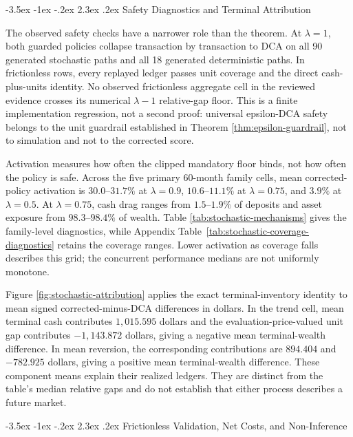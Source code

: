 \documentclass[12pt,a4paper,oneside]{report}
\makeatletter
\renewcommand\section{\@startsection{section}{1}{\z@}%
  {-3.5ex \@plus -1ex \@minus -.2ex}%
  {2.3ex \@plus .2ex}%
  {\normalfont\fontsize{14}{17}\selectfont\bfseries}}
\makeatother
\begin{document}
\section{Safety Diagnostics and Terminal Attribution}
\label{sec:synthetic-mechanisms}
\label{sec:safety-checks}

The observed safety checks have a narrower role than the theorem. At
$\lambda=1$, both guarded policies collapse transaction by transaction to DCA
on all 90 generated stochastic paths and all 18 generated deterministic
paths. In frictionless rows, every replayed ledger passes unit coverage and the direct
cash-plus-units identity. No observed frictionless aggregate cell in the
reviewed evidence crosses its numerical $\lambda-1$ relative-gap floor. This
is a finite implementation regression, not a second proof: universal
epsilon-DCA safety belongs to the unit guardrail established in Theorem
\ref{thm:epsilon-guardrail}, not to simulation and not to the corrected score.



Activation measures how often the clipped mandatory floor binds, not how often
the policy is safe. Across the five primary 60-month family cells, mean
corrected-policy activation is $30.0$--$31.7\%$ at $\lambda=0.9$,
$10.6$--$11.1\%$ at $\lambda=0.75$, and $3.9\%$ at $\lambda=0.5$.
At $\lambda=0.75$, cash drag ranges from $1.5$--$1.9\%$ of deposits and
asset exposure from $98.3$--$98.4\%$ of wealth. Table
\ref{tab:stochastic-mechanisms} gives the family-level diagnostics, while
Appendix Table~\ref{tab:stochastic-coverage-diagnostics} retains the coverage
ranges. Lower activation as coverage falls describes this grid; the concurrent
performance medians are not uniformly monotone.

Figure \ref{fig:stochastic-attribution} applies the exact terminal-inventory
identity to mean signed corrected-minus-DCA differences in dollars. In the
trend cell, mean
terminal cash contributes $1,015.595$ dollars and the evaluation-price-valued
unit gap contributes $-1,143.872$ dollars, giving a
negative mean terminal-wealth difference. In mean reversion, the corresponding
contributions are $894.404$ and $-782.925$ dollars, giving a
positive mean terminal-wealth difference. These component means
explain their realized ledgers. They are distinct from the table's median
relative gaps and do not establish that either process describes a future
market.

\section{Frictionless Validation, Net Costs, and Non-Inference}
\label{sec:synthetic-cost-scope}
\end{document}
